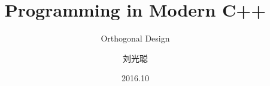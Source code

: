 \title[Orthogonal Design]
{Programming in Modern C++}

\subtitle{Orthogonal Design}

\author[刘光聪]
{ 刘光聪
}

\institute[]
{
}

\date[2016.10]{2016.10}
